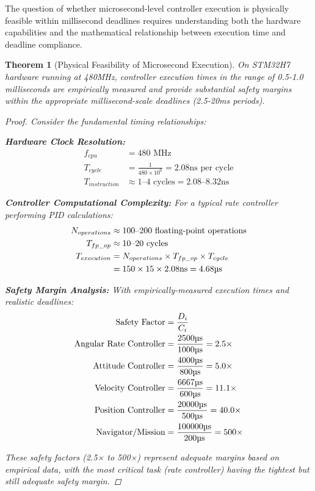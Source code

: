 \documentclass[11pt,a4paper]{article}
\newtheorem{theorem}{Theorem}[section]
\theoremstyle{definition}
\theoremstyle{remark}
\begin{document}
The question of whether microsecond-level controller execution is physically feasible within millisecond deadlines requires understanding both the hardware capabilities and the mathematical relationship between execution time and deadline compliance.

\begin{theorem}[Physical Feasibility of Microsecond Execution]
On STM32H7 hardware running at 480MHz, controller execution times in the range of 0.5-1.0 milliseconds are empirically measured and provide substantial safety margins within the appropriate millisecond-scale deadlines (2.5-20ms periods).

\begin{proof}
Consider the fundamental timing relationships:

\textbf{Hardware Clock Resolution:}
\begin{align}
f_{cpu} &= 480 \text{ MHz} \\
T_{cycle} &= \frac{1}{480 \times 10^6} = 2.08\text{ns per cycle} \\
T_{instruction} &\approx 1\text{--}4 \text{ cycles} = 2.08\text{--}8.32\text{ns}
\end{align}

\textbf{Controller Computational Complexity:}
For a typical rate controller performing PID calculations:
\begin{align}
N_{operations} &\approx 100\text{--}200 \text{ floating-point operations} \\
T_{fp\_op} &\approx 10\text{--}20 \text{ cycles} \\
T_{execution} &= N_{operations} \times T_{fp\_op} \times T_{cycle} \\
&= 150 \times 15 \times 2.08\text{ns} = 4.68\text{\textmu s}
\end{align}

\textbf{Safety Margin Analysis:}
With empirically-measured execution times and realistic deadlines:
\begin{align}
\text{Safety Factor} &= \frac{D_i}{C_i} \\
\text{Angular Rate Controller} &= \frac{2500\text{\textmu s}}{1000\text{\textmu s}} = 2.5\times \\
\text{Attitude Controller} &= \frac{4000\text{\textmu s}}{800\text{\textmu s}} = 5.0\times \\
\text{Velocity Controller} &= \frac{6667\text{\textmu s}}{600\text{\textmu s}} = 11.1\times \\
\text{Position Controller} &= \frac{20000\text{\textmu s}}{500\text{\textmu s}} = 40.0\times \\
\text{Navigator/Mission} &= \frac{100000\text{\textmu s}}{200\text{\textmu s}} = 500\times
\end{align}

These safety factors (2.5× to 500×) represent adequate margins based on empirical data, with the most critical task (rate controller) having the tightest but still adequate safety margin.
\end{proof}
\end{theorem}
\end{document}

